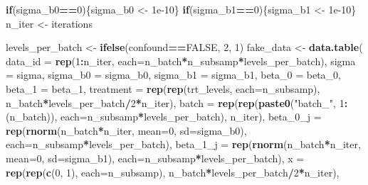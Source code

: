 \documentclass[]{book}
\newenvironment{Shaded}{\begin{snugshade}}{\end{snugshade}}
\newcommand{\ControlFlowTok}[1]{\textcolor[rgb]{0.13,0.29,0.53}{\textbf{#1}}}
\newcommand{\DataTypeTok}[1]{\textcolor[rgb]{0.13,0.29,0.53}{#1}}
\newcommand{\DecValTok}[1]{\textcolor[rgb]{0.00,0.00,0.81}{#1}}
\newcommand{\FloatTok}[1]{\textcolor[rgb]{0.00,0.00,0.81}{#1}}
\newcommand{\KeywordTok}[1]{\textcolor[rgb]{0.13,0.29,0.53}{\textbf{#1}}}
\newcommand{\NormalTok}[1]{#1}
\newcommand{\OperatorTok}[1]{\textcolor[rgb]{0.81,0.36,0.00}{\textbf{#1}}}
\newcommand{\OtherTok}[1]{\textcolor[rgb]{0.56,0.35,0.01}{#1}}
\newcommand{\StringTok}[1]{\textcolor[rgb]{0.31,0.60,0.02}{#1}}
\begin{document}
\begin{Shaded}
\begin{Highlighting}[]
  \ControlFlowTok{if}\NormalTok{(sigma_b0}\OperatorTok{==}\DecValTok{0}\NormalTok{)\{sigma_b0 <-}\StringTok{ }\FloatTok{1e-10}\NormalTok{\}}
  \ControlFlowTok{if}\NormalTok{(sigma_b1}\OperatorTok{==}\DecValTok{0}\NormalTok{)\{sigma_b1 <-}\StringTok{ }\FloatTok{1e-10}\NormalTok{\}}
\NormalTok{  n_iter <-}\StringTok{ }\NormalTok{iterations}
  
\NormalTok{  levels_per_batch <-}\StringTok{ }\KeywordTok{ifelse}\NormalTok{(confound}\OperatorTok{==}\OtherTok{FALSE}\NormalTok{, }\DecValTok{2}\NormalTok{, }\DecValTok{1}\NormalTok{)}
\NormalTok{  fake_data <-}\StringTok{ }\KeywordTok{data.table}\NormalTok{(}
    \DataTypeTok{data_id =} \KeywordTok{rep}\NormalTok{(}\DecValTok{1}\OperatorTok{:}\NormalTok{n_iter, }\DataTypeTok{each=}\NormalTok{n_batch}\OperatorTok{*}\NormalTok{n_subsamp}\OperatorTok{*}\NormalTok{levels_per_batch),}
    \DataTypeTok{sigma =}\NormalTok{ sigma,}
    \DataTypeTok{sigma_b0 =}\NormalTok{ sigma_b0,}
    \DataTypeTok{sigma_b1 =}\NormalTok{ sigma_b1,}
    \DataTypeTok{beta_0 =}\NormalTok{ beta_}\DecValTok{0}\NormalTok{,}
    \DataTypeTok{beta_1 =}\NormalTok{ beta_}\DecValTok{1}\NormalTok{,}
    \DataTypeTok{treatment =} \KeywordTok{rep}\NormalTok{(}\KeywordTok{rep}\NormalTok{(trt_levels, }\DataTypeTok{each=}\NormalTok{n_subsamp), n_batch}\OperatorTok{*}\NormalTok{levels_per_batch}\OperatorTok{/}\DecValTok{2}\OperatorTok{*}\NormalTok{n_iter),}
    \DataTypeTok{batch =} \KeywordTok{rep}\NormalTok{(}\KeywordTok{rep}\NormalTok{(}\KeywordTok{paste0}\NormalTok{(}\StringTok{"batch_"}\NormalTok{, }\DecValTok{1}\OperatorTok{:}\NormalTok{(n_batch)), }\DataTypeTok{each=}\NormalTok{n_subsamp}\OperatorTok{*}\NormalTok{levels_per_batch), n_iter),}
    \DataTypeTok{beta_0_j =} \KeywordTok{rep}\NormalTok{(}\KeywordTok{rnorm}\NormalTok{(n_batch}\OperatorTok{*}\NormalTok{n_iter, }\DataTypeTok{mean=}\DecValTok{0}\NormalTok{, }\DataTypeTok{sd=}\NormalTok{sigma_b0), }\DataTypeTok{each=}\NormalTok{n_subsamp}\OperatorTok{*}\NormalTok{levels_per_batch),}
    \DataTypeTok{beta_1_j =} \KeywordTok{rep}\NormalTok{(}\KeywordTok{rnorm}\NormalTok{(n_batch}\OperatorTok{*}\NormalTok{n_iter, }\DataTypeTok{mean=}\DecValTok{0}\NormalTok{, }\DataTypeTok{sd=}\NormalTok{sigma_b1), }\DataTypeTok{each=}\NormalTok{n_subsamp}\OperatorTok{*}\NormalTok{levels_per_batch),}
    \DataTypeTok{x =} \KeywordTok{rep}\NormalTok{(}\KeywordTok{rep}\NormalTok{(}\KeywordTok{c}\NormalTok{(}\DecValTok{0}\NormalTok{, }\DecValTok{1}\NormalTok{), }\DataTypeTok{each=}\NormalTok{n_subsamp), n_batch}\OperatorTok{*}\NormalTok{levels_per_batch}\OperatorTok{/}\DecValTok{2}\OperatorTok{*}\NormalTok{n_iter),}

\end{Highlighting}
\end{Shaded}
\end{document}
